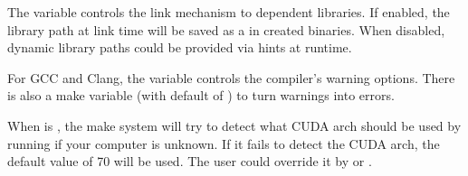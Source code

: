 \documentclass[letterpaper,10pt,english]{sphinxmanual}
\begin{document}
\sphinxAtStartPar
The variable  controls the link mechanism to dependent libraries.
If enabled, the library path at link time will be saved as a
 in created binaries.
When disabled, dynamic library paths could be provided via 
hints at runtime.

\sphinxAtStartPar
For GCC and Clang, the variable  controls the compiler’s warning options.  There is
also a make variable  (with default of ) to turn warnings into errors.

\sphinxAtStartPar
When  is , the make system will try to detect what CUDA
arch should be used by running
 if your computer is unknown.
If it fails to detect the CUDA arch, the default value of 70 will be used.
The user could override it by  or .
\end{document}
